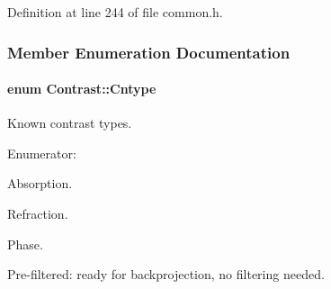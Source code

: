 Definition at line 244 of file common.h.



\subsubsection{Member Enumeration Documentation}
\hypertarget{classContrast_a99b7c9b3f4f10b92a6db24002adac72f}{
\paragraph[{Cntype}]{\setlength{\rightskip}{0pt plus 5cm}enum {\bf Contrast::Cntype}}\hfill}
\label{classContrast_a99b7c9b3f4f10b92a6db24002adac72f}


Known contrast types. 

\begin{Desc}
\item[Enumerator: ]\par
\begin{description}
\item[{\em 
\hypertarget{classContrast_a99b7c9b3f4f10b92a6db24002adac72fa81734a45711f288f6c5e7f54bcbbffbb}{
ABS}
\label{classContrast_a99b7c9b3f4f10b92a6db24002adac72fa81734a45711f288f6c5e7f54bcbbffbb}
}]Absorption. \item[{\em 
\hypertarget{classContrast_a99b7c9b3f4f10b92a6db24002adac72faf34254288d1ad4c4847bf6dec827b603}{
REF}
\label{classContrast_a99b7c9b3f4f10b92a6db24002adac72faf34254288d1ad4c4847bf6dec827b603}
}]Refraction. \item[{\em 
\hypertarget{classContrast_a99b7c9b3f4f10b92a6db24002adac72fa1b525c7d8fa77ecc38d32957bdbb2a77}{
PHS}
\label{classContrast_a99b7c9b3f4f10b92a6db24002adac72fa1b525c7d8fa77ecc38d32957bdbb2a77}
}]Phase. \item[{\em 
\hypertarget{classContrast_a99b7c9b3f4f10b92a6db24002adac72fa1d6ff103864450064c6bba77f807fa50}{
FLT}
\label{classContrast_a99b7c9b3f4f10b92a6db24002adac72fa1d6ff103864450064c6bba77f807fa50}
}]Pre-\/filtered: ready for backprojection, no filtering needed. \end{description}
\end{Desc}



